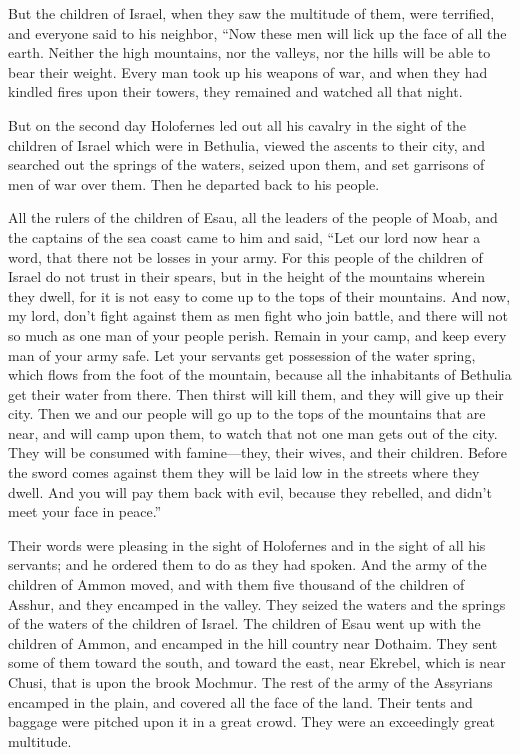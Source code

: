  But the children of Israel, when they saw the multitude of
them, were terrified, and everyone said to his neighbor, ``Now these men
will lick up the face of all the earth. Neither the high mountains, nor
the valleys, nor the hills will be able to bear their weight.
 Every man took up his weapons of war, and when they had
kindled fires upon their towers, they remained and watched all that
night.

 But on the second day Holofernes led out all his cavalry in
the sight of the children of Israel which were in Bethulia, 
viewed the ascents to their city, and searched out the springs of the
waters, seized upon them, and set garrisons of men of war over them.
Then he departed back to his people.

 All the rulers of the children of Esau, all the leaders of
the people of Moab, and the captains of the sea coast came to him and
said,  ``Let our lord now hear a word, that there not be
losses in your army.  For this people of the children of
Israel do not trust in their spears, but in the height of the mountains
wherein they dwell, for it is not easy to come up to the tops of their
mountains.  And now, my lord, don't fight against them as
men fight who join battle, and there will not so much as one man of your
people perish.  Remain in your camp, and keep every man of
your army safe. Let your servants get possession of the water spring,
which flows from the foot of the mountain,  because all the
inhabitants of Bethulia get their water from there. Then thirst will
kill them, and they will give up their city. Then we and our people will
go up to the tops of the mountains that are near, and will camp upon
them, to watch that not one man gets out of the city.  They
will be consumed with famine---they, their wives, and their children.
Before the sword comes against them they will be laid low in the streets
where they dwell.  And you will pay them back with evil,
because they rebelled, and didn't meet your face in peace.''

 Their words were pleasing in the sight of Holofernes and
in the sight of all his servants; and he ordered them to do as they had
spoken.  And the army of the children of Ammon moved, and
with them five thousand of the children of Asshur, and they encamped in
the valley. They seized the waters and the springs of the waters of the
children of Israel.  The children of Esau went up with the
children of Ammon, and encamped in the hill country near Dothaim. They
sent some of them toward the south, and toward the east, near Ekrebel,
which is near Chusi, that is upon the brook Mochmur. The rest of the
army of the Assyrians encamped in the plain, and covered all the face of
the land. Their tents and baggage were pitched upon it in a great crowd.
They were an exceedingly great multitude.

